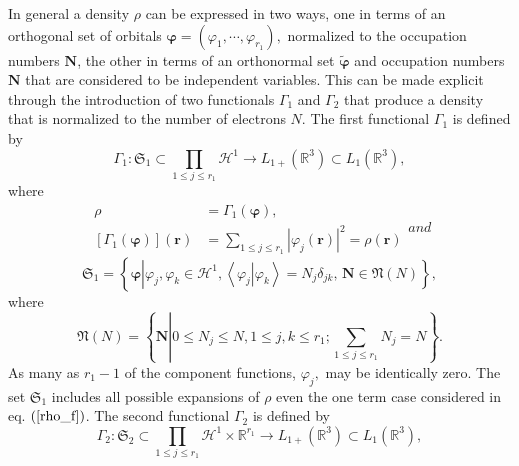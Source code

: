 \documentclass[aps,preprint]{revtex4}%
\begin{document}
In general a density $\rho$ can be expressed in two ways, one in terms of an
orthogonal set of orbitals $\boldsymbol{\varphi}=\left(  \varphi_{1}%
,\cdots,\varphi_{r_{1}}\right)  \boldsymbol{,}$ normalized to the occupation
numbers $\boldsymbol{N}$, the other in terms of an orthonormal set
$\boldsymbol{\tilde{\varphi}}$ and occupation numbers $\boldsymbol{N}$ that
are considered to be independent variables. This can be made explicit through
the introduction of two functionals $\Gamma_{1}$ and $\Gamma_{2}$ that produce
a density that is normalized to the number of electrons $N.$ The first
functional $\Gamma_{1}$ is defined by
\begin{equation}
\Gamma_{1}:\mathfrak{S}_{1}\subset\prod\limits_{1\leq j\leq r_{1}}%
\mathcal{H}^{1}\rightarrow L_{1+}\left(  \mathbb{R}^{3}\right)  \subset
L_{1}\left(  \mathbb{R}^{3}\right)  ,
\end{equation}
where
\begin{subequations}
\label{GammaAll}%
\begin{align}
\rho &  =\Gamma_{1}\left(  \boldsymbol{\varphi}\right)  ,\\
\left[  \Gamma_{1}\left(  \boldsymbol{\varphi}\right)  \right]  \left(
\boldsymbol{r}\right)   &  =\sum_{1\leq j\leq r_{1}}\left\vert \varphi
_{j}\left(  \boldsymbol{r}\right)  \right\vert ^{2}=\rho\left(  \boldsymbol{r}%
\right)  \label{Gamma}%
\end{align}
and%
\end{subequations}
\begin{equation}
\mathfrak{S}_{1}=\left\{  \boldsymbol{\varphi}\left\vert \varphi_{j}%
,\varphi_{k}\in\mathcal{H}^{1},\left\langle \left.  \varphi_{j}\right\vert
\varphi_{k}\right\rangle =N_{j}\delta_{jk},\,\boldsymbol{N}\in\mathfrak{N}%
\left(  N\right)  \right.  \right\}  ,\label{set1}%
\end{equation}
where
\begin{equation}
\mathfrak{N}\left(  N\right)  =\left\{  \boldsymbol{N}\left\vert 0\leq
N_{j}\leq N,1\leq j,k\leq r_{1};\sum_{1\leq j\leq r_{1}}N_{j}=N\right.
\right\}  .
\end{equation}
As many as $r_{1}-1$ of the component functions, $\varphi_{j},$ may be
identically zero. The set $\mathfrak{S}_{1}$ includes all possible expansions
of $\rho$ even the one term case considered in eq. $\left(  \ref{rho_f}%
\right)  $. The second functional $\Gamma_{2}$ is defined by
\begin{equation}
\Gamma_{2}:\mathfrak{S}_{2}\subset\prod\limits_{1\leq j\leq r_{1}}%
\mathcal{H}^{1}\times\mathbb{R}^{r_{1}}\rightarrow L_{1+}\left(
\mathbb{R}^{3}\right)  \subset L_{1}\left(  \mathbb{R}^{3}\right)  ,
\end{equation}
\end{document}
